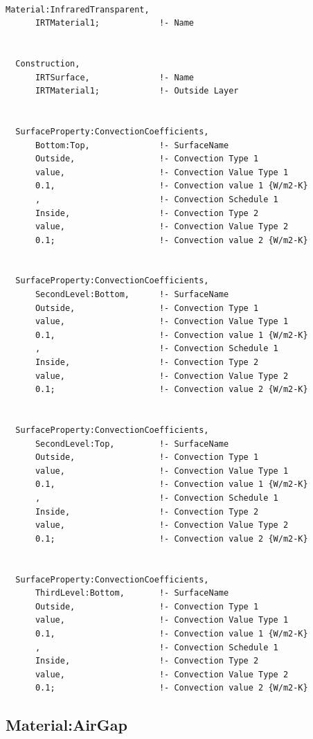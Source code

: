 \begin{lstlisting}

Material:InfraredTransparent,
      IRTMaterial1;            !- Name


  Construction,
      IRTSurface,              !- Name
      IRTMaterial1;            !- Outside Layer


  SurfaceProperty:ConvectionCoefficients,
      Bottom:Top,              !- SurfaceName
      Outside,                 !- Convection Type 1
      value,                   !- Convection Value Type 1
      0.1,                     !- Convection value 1 {W/m2-K}
      ,                        !- Convection Schedule 1
      Inside,                  !- Convection Type 2
      value,                   !- Convection Value Type 2
      0.1;                     !- Convection value 2 {W/m2-K}


  SurfaceProperty:ConvectionCoefficients,
      SecondLevel:Bottom,      !- SurfaceName
      Outside,                 !- Convection Type 1
      value,                   !- Convection Value Type 1
      0.1,                     !- Convection value 1 {W/m2-K}
      ,                        !- Convection Schedule 1
      Inside,                  !- Convection Type 2
      value,                   !- Convection Value Type 2
      0.1;                     !- Convection value 2 {W/m2-K}


  SurfaceProperty:ConvectionCoefficients,
      SecondLevel:Top,         !- SurfaceName
      Outside,                 !- Convection Type 1
      value,                   !- Convection Value Type 1
      0.1,                     !- Convection value 1 {W/m2-K}
      ,                        !- Convection Schedule 1
      Inside,                  !- Convection Type 2
      value,                   !- Convection Value Type 2
      0.1;                     !- Convection value 2 {W/m2-K}


  SurfaceProperty:ConvectionCoefficients,
      ThirdLevel:Bottom,       !- SurfaceName
      Outside,                 !- Convection Type 1
      value,                   !- Convection Value Type 1
      0.1,                     !- Convection value 1 {W/m2-K}
      ,                        !- Convection Schedule 1
      Inside,                  !- Convection Type 2
      value,                   !- Convection Value Type 2
      0.1;                     !- Convection value 2 {W/m2-K}
\end{lstlisting}

\subsection{Material:AirGap}\label{materialairgap}


